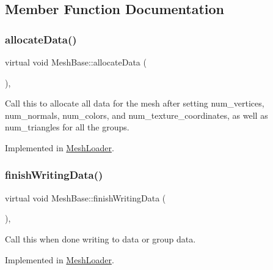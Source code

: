 \subsection{Member Function Documentation}
\mbox{\label{class_mesh_base_a30c0ef8b3faabc9b41520b85dd9413bb}} 
\subsubsection{\texorpdfstring{allocate\+Data()}{allocateData()}}
{\footnotesize\ttfamily virtual void Mesh\+Base\+::allocate\+Data (\begin{DoxyParamCaption}{ }\end{DoxyParamCaption})\hspace{0.3cm}{\ttfamily [protected]}, {}}

Call this to allocate all data for the mesh after setting num\+\_\+vertices, num\+\_\+normals, num\+\_\+colors, and num\+\_\+texture\+\_\+coordinates, as well as num\+\_\+triangles for all the groups. 

Implemented in \hyperlink{class_mesh_loader_a8bdf8e0894e147be8d3e287f46feff6a}{Mesh\+Loader}.

\mbox{\label{class_mesh_base_a000796d7b04985f137d5a1368e90bcc6}} 
\subsubsection{\texorpdfstring{finish\+Writing\+Data()}{finishWritingData()}}
{\footnotesize\ttfamily virtual void Mesh\+Base\+::finish\+Writing\+Data (\begin{DoxyParamCaption}{ }\end{DoxyParamCaption})\hspace{0.3cm}{\ttfamily [protected]}, {}}

Call this when done writing to data or group data. 

Implemented in \hyperlink{class_mesh_loader_a65847db267f07f637deab0889c283bfa}{Mesh\+Loader}.

\mbox{\label{class_mesh_base_a63937b1025ad3f9b4b2a4733a7409ff0}} 
